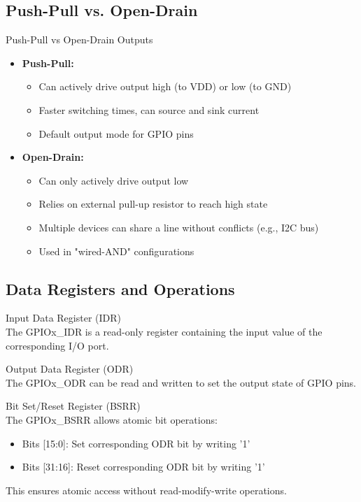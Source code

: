 \subsection{Push-Pull vs. Open-Drain}

\begin{concept}{Push-Pull vs Open-Drain Outputs}
\begin{itemize}
    \item \textbf{Push-Pull:}
    \begin{itemize}
        \item Can actively drive output high (to VDD) or low (to GND)
        \item Faster switching times, can source and sink current
        \item Default output mode for GPIO pins
    \end{itemize}
    \item \textbf{Open-Drain:}
    \begin{itemize}
        \item Can only actively drive output low
        \item Relies on external pull-up resistor to reach high state
        \item Multiple devices can share a line without conflicts (e.g., I2C bus)
        \item Used in "wired-AND" configurations
    \end{itemize}
\end{itemize}
\end{concept}

\subsection{Data Registers and Operations}

\begin{definition}{Input Data Register (IDR)}\\
The GPIOx\_IDR is a read-only register containing the input value of the corresponding I/O port.
\end{definition}

\begin{definition}{Output Data Register (ODR)}\\
The GPIOx\_ODR can be read and written to set the output state of GPIO pins.
\end{definition}

\begin{definition}{Bit Set/Reset Register (BSRR)}\\
The GPIOx\_BSRR allows atomic bit operations:
\begin{itemize}
    \item Bits [15:0]: Set corresponding ODR bit by writing '1'
    \item Bits [31:16]: Reset corresponding ODR bit by writing '1'
\end{itemize}
This ensures atomic access without read-modify-write operations.
\end{definition}

